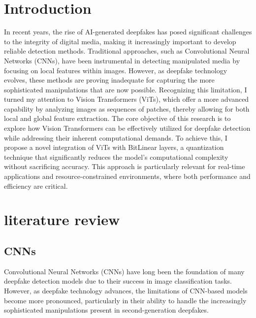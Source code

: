\documentclass[conference]{IEEEtran}
\begin{document}
		
		
		\maketitle
		
		
		\section{Introduction}
		In recent years, the rise of AI-generated deepfakes has posed significant challenges to the integrity of digital media, making it increasingly important to develop reliable detection methods. Traditional approaches, such as Convolutional Neural Networks (CNNs), have been instrumental in detecting manipulated media by focusing on local features within images. However, as deepfake technology evolves, these methods are proving inadequate for capturing the more sophisticated manipulations that are now possible. Recognizing this limitation, I turned my attention to Vision Transformers (ViTs), which offer a more advanced capability by analyzing images as sequences of patches, thereby allowing for both local and global feature extraction. The core objective of this research is to explore how Vision Transformers can be effectively utilized for deepfake detection while addressing their inherent computational demands. To achieve this, I propose a novel integration of ViTs with BitLinear layers, a quantization technique that significantly reduces the model's computational complexity without sacrificing accuracy. This approach is particularly relevant for real-time applications and resource-constrained environments, where both performance and efficiency are critical.
		
		
		
		\section{literature review}
		
		\subsection{CNNs}
		Convolutional Neural Networks (CNNs) have long been the foundation of many deepfake detection models due to their success in image classification tasks. However, as deepfake technology advances, the limitations of CNN-based models become more pronounced, particularly in their ability to handle the increasingly sophisticated manipulations present in second-generation deepfakes.
		
\end{document}
